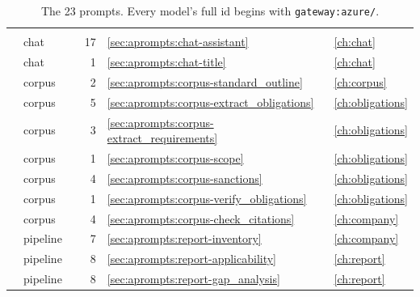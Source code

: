 \begin{xltabular}{\textwidth}{@{}L{50mm}L{15mm}L{24mm}rL{11mm}Y@{}}
\caption{The 23 prompts. Every model's full id begins with \texttt{gateway:azure/}.}\label{tab:aprompts:all}\\
\toprule
{} &  &  &  &  &  \\
\midrule
\endfirsthead
\toprule
{} &  &  &  &  &  \\
\midrule
\endhead
\bottomrule
\endlastfoot
{} & chat &  & 17 & \ref{sec:aprompts:chat-assistant} & \cref{ch:chat} \\
 & chat &  & 1 & \ref{sec:aprompts:chat-title} & \cref{ch:chat} \\
 & corpus &  & 2 & \ref{sec:aprompts:corpus-standard_outline} & \cref{ch:corpus} \\
 & corpus &  & 5 & \ref{sec:aprompts:corpus-extract_obligations} & \cref{ch:obligations} \\
 & corpus &  & 3 & \ref{sec:aprompts:corpus-extract_requirements} & \cref{ch:obligations} \\
 & corpus &  & 1 & \ref{sec:aprompts:corpus-scope} & \cref{ch:obligations} \\
 & corpus &  & 4 & \ref{sec:aprompts:corpus-sanctions} & \cref{ch:obligations} \\
 & corpus &  & 1 & \ref{sec:aprompts:corpus-verify_obligations} & \cref{ch:obligations} \\
 & corpus &  & 4 & \ref{sec:aprompts:corpus-check_citations} & \cref{ch:company} \\
 & pipeline &  & 7 & \ref{sec:aprompts:report-inventory} & \cref{ch:company} \\
 & pipeline &  & 8 & \ref{sec:aprompts:report-applicability} & \cref{ch:report} \\
 & pipeline &  & 8 & \ref{sec:aprompts:report-gap_analysis} & \cref{ch:report} \\

\end{xltabular}
